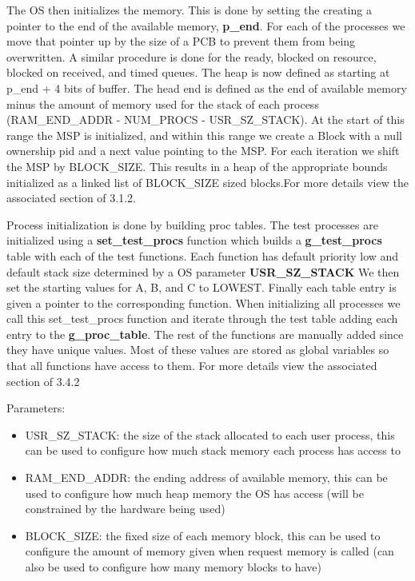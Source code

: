 \documentclass[11pt, oneside]{article}
\begin{document}
The OS then initializes the memory. This is done by setting the creating a pointer to the end of the available memory, \textbf{p\_end}. For each of the processes we move that pointer up by the size of a PCB to prevent them from being overwritten. A similar procedure is done for the ready, blocked on resource, blocked on received, and timed queues. The heap is now defined as starting at p\_end + 4 bits of buffer. The head end is defined as the end of available memory minus the amount of memory used for the stack of each process (RAM\_END\_ADDR - NUM\_PROCS - USR\_SZ\_STACK). At the start of this range the MSP is initialized, and within this range we create a Block with a null ownership pid and a next value pointing to the MSP. For each iteration we shift the MSP by BLOCK\_SIZE. This results in a heap of the appropriate bounds initialized as a linked list of BLOCK\_SIZE sized blocks.For more details view the associated section of 3.1.2.

Process initialization is done by building proc tables. The test processes are initialized using a \textbf{set\_test\_procs} function which builds a \textbf{g\_test\_procs} table with each of the test functions. Each function has default priority low and default stack size determined by a OS parameter \textbf{USR\_SZ\_STACK} We then set the starting values for A, B, and C to LOWEST. Finally each table entry is given a pointer to the corresponding function. When initializing all processes we call this set\_test\_procs function and iterate through the test table adding each entry to the \textbf{g\_proc\_table}. The rest of the functions are manually added since they have unique values. Most of these values are stored as global variables so that all functions have access to them. For more details view the associated section of 3.4.2

Parameters:
\begin{itemize}
    \item USR\_SZ\_STACK: the size of the stack allocated to each user process, this can be used to configure how much stack memory each process has access to
    \item RAM\_END\_ADDR: the ending address of available memory, this can be used to configure how much heap memory the OS has access (will be constrained by the hardware being used)
    \item BLOCK\_SIZE: the fixed size of each memory block, this can be used to configure the amount of memory given when request memory is called (can also be used to configure how many memory blocks to have)
\end{itemize}
\end{document}
